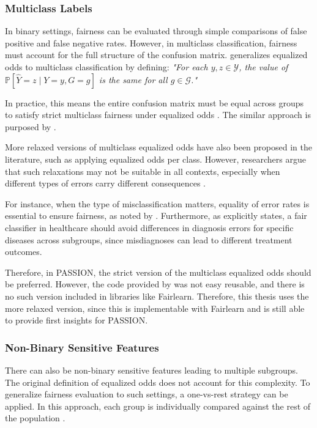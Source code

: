 \documentclass[12pt, a4paper, oneside]{book}   	%
\renewcommand{\paragraph}[1]{%
	\subsubsection*{#1}%
}
\begin{document}
		\paragraph{Multiclass Labels}
		In binary settings, fairness can be evaluated through simple comparisons of false positive and false negative rates. However, in multiclass classification, fairness must account for the full structure of the confusion matrix. \textcite{Sabato_2024} generalizes equalized odds to multiclass classification by defining:
		\textit{"For each \( y, z \in \mathcal{Y} \), the value of \( \mathbb{P}[\hat{Y} = z \mid Y = y, G = g] \) is the same for all \( g \in \mathcal{G} \)."}
		
		In practice, this means the entire confusion matrix must be equal across groups to satisfy strict multiclass fairness under equalized odds \autocite{Sabato_2024}. The similar approach is purposed by \textcite{Putzel_2022}.
		
		More relaxed versions of multiclass equalized odds have also been proposed in the literature, such as applying equalized odds per class. However, researchers argue that such relaxations may not be suitable in all contexts, especially when different types of errors carry different consequences \autocites{Sabato_2024}{Putzel_2022}.
		
		For instance, when the type of misclassification matters, equality of error rates is essential to ensure fairness, as noted by \textcite{Putzel_2022}. Furthermore, as \textcite{Sabato_2024} explicitly states, a fair classifier in healthcare should avoid differences in diagnosis errors for specific diseases across subgroups, since misdiagnoses can lead to different treatment outcomes.
		
		Therefore, in PASSION, the strict version of the multiclass equalized odds should be preferred. However, the code provided by \textcite{Sabato_2024} was not easy reusable, and there is no such version included in libraries like \gls{Fairlearn}. Therefore, this thesis uses the more relaxed version, since this is implementable with \gls{Fairlearn} and is still able to provide first insights for PASSION.
		
		\paragraph{Non-Binary Sensitive Features}
		There can also be non-binary sensitive features leading to multiple subgroups. The original definition of equalized odds does not account for this complexity. To generalize fairness evaluation to such settings, a one-vs-rest strategy can be applied. In this approach, each group is individually compared against the rest of the population \autocite{Nezami_2024}.
		
\end{document}
